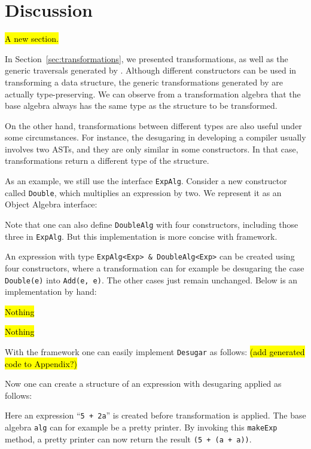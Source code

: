 \section{Discussion}
\label{sec:discussion}

\hl{A new section.}

In Section~\ref{sec:transformations}, we presented transformations, as well as the generic traversals generated by \name. Although different constructors can be used in transforming a data structure, the generic transformations generated by \name are actually type-preserving. We can observe from a transformation algebra that the base algebra always has the same type as the structure to be transformed.

On the other hand, transformations between different types are also useful under some circumstances. For instance, the desugaring in developing a compiler usually involves two ASTs, and they are only similar in some constructors. In that case, transformations return a different type of the structure.

As an example, we still use the interface \lstinline{ExpAlg}. Consider a new constructor called \lstinline{Double}, which multiplies an expression by two. We represent it as an Object Algebra interface:


\noindent Note that one can also define \lstinline{DoubleAlg} with four constructors, including those three in \lstinline{ExpAlg}. But this implementation is more concise with \name framework.

An expression with type \lstinline{ExpAlg<Exp> & DoubleAlg<Exp>} can be created using four constructors, where a transformation can for example be desugaring the case \lstinline{Double(e)} into \lstinline{Add(e, e)}. The other cases just remain unchanged. Below is an implementation by hand:


\hl{Nothing}

\hl{Nothing}

\noindent With the \name framework one can easily implement \lstinline{Desugar} as follows: \hl{(add generated code to Appendix?)}


\noindent Now one can create a structure of an expression with desugaring applied as follows:


\noindent Here an expression ``\lstinline{5 + 2a}'' is created before transformation is applied. The base algebra \lstinline{alg} can for example be a pretty printer. By invoking this \lstinline{makeExp} method, a pretty printer can now return the result \lstinline{(5 + (a + a))}.